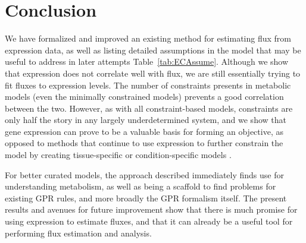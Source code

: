 


%
%


\section{Conclusion}

We have formalized and improved an existing method for estimating flux
from expression data, as well as listing detailed assumptions in the
model that may be useful to address in later attempts
Table~\ref{tab:ECAssume}.  Although we show that expression does not
correlate well with flux, we are still essentially trying to fit
fluxes to expression levels.  The number of constraints presents in
metabolic models (even the minimally constrained models) prevents 
a good correlation between the two. However, as
with all constraint-based models, constraints are only half the story in any largely
underdetermined system, and we show that gene expression can prove to
be a valuable basis for forming an objective, as opposed to methods
that continue to use expression to further constrain the model by
creating tissue-specific or condition-specific models
\citep{Shlomi2008,Becker2008}.

For better curated models, the approach described immediately finds
use for understanding metabolism, as well as being a scaffold to find
problems for existing GPR rules, and more broadly the GPR formalism itself.
The present results and avenues for future improvement
show that there is much promise for using expression to estimate
fluxes, and that it can already be a useful tool for performing flux
estimation and analysis.

